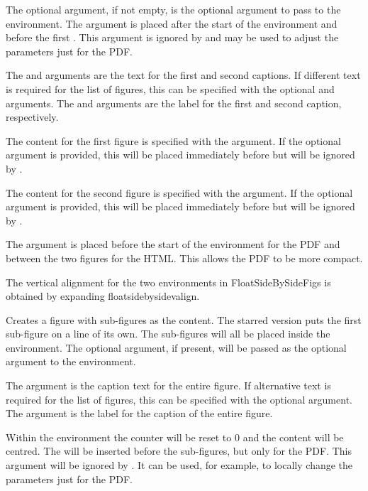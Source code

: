 \documentclass[toc=listof]{scrreport}
\begin{document}
The  optional argument, if not empty, is the optional
argument to pass to the  environment. 
The  argument is placed after the start of the
 environment and before the first . 
This argument is ignored by  and may be used to
adjust the  parameters just for the PDF.

The  and  arguments are the text for
the first and second captions. If different text is required for the
list of figures, this can be specified with the optional
 and  arguments.
The  and  arguments are the label for the
first and second caption, respectively.

The content for the first figure is specified with the
 argument. If the optional  
argument is provided, this will be placed immediately before
 but will be ignored by .

The content for the second figure is specified with the
 argument. If the optional  
argument is provided, this will be placed immediately before
 but will be ignored by .

The 
argument is placed before the start of the  environment
for the PDF and between the two figures for the HTML. 
This allows the PDF to be more compact.

The vertical alignment for the two  environments in
\gls{FloatSideBySideFigs} is obtained by expanding
\gls{floatsidebysidevalign}.

Creates a figure with sub-figures as the content. The starred
version puts the first sub-figure on a line of its own. The
sub-figures will all be placed inside the  environment.
The optional  argument, if present, will be passed as the
optional argument to the  environment.

The  argument is the caption text for the entire figure.
If alternative text is required for the list of figures, this can be
specified with the optional  argument. The 
argument is the label for the caption of the entire figure.

Within the  environment the  counter will
be reset to 0 and the content will be centred. The  will be inserted before the sub-figures, but only
for the PDF. This argument will be ignored by \app{texjavahelpmk}.
It can be used, for example, to locally change the \sty{graphicx}
parameters just for the PDF.
\end{document}
